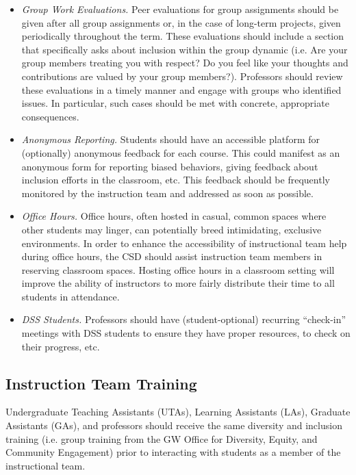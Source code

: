 \documentclass{article}
\begin{document}
\begin{itemize}
\item
\emph{Group Work Evaluations.} Peer evaluations for group assignments should be given after all group assignments 
or, in the case of long-term projects, given periodically throughout the term. These evaluations should include a 
section that specifically asks about inclusion within the group dynamic (i.e. Are your group members treating 
you with respect? Do you feel like your thoughts and contributions are valued by your group members?). Professors 
should review these evaluations in a timely manner and engage with groups who identified issues. 
In particular, such cases should be met with concrete, appropriate consequences.

\item
\emph{Anonymous Reporting.} 
Students should have an accessible platform for (optionally) anonymous feedback for each course. 
This could manifest as an anonymous form for reporting biased behaviors, giving feedback about inclusion efforts 
in the classroom, etc. This feedback should be frequently monitored by the instruction team and addressed as soon 
as possible. 

\item 
\emph{Office Hours.} 
Office hours, often hosted in casual, common spaces where other students may linger, 
can potentially breed intimidating, exclusive environments. In order to enhance the accessibility of 
instructional team help during office hours, the CSD should assist instruction team members in reserving 
classroom spaces. Hosting office hours in a classroom setting will improve the ability of instructors to more 
fairly distribute their time to all students in attendance. 

\item
\emph{DSS Students.} 
Professors should have (student-optional) recurring “check-in” meetings with DSS students to 
ensure they have proper resources, to check on their progress, etc.
\end{itemize}

\subsection{Instruction Team Training} 
Undergraduate Teaching Assistants (UTAs), Learning Assistants (LAs), Graduate Assistants (GAs), and 
professors should receive the same diversity and inclusion training (i.e. group training from the GW Office 
for Diversity, Equity, and Community Engagement) prior to interacting with students as a member of the 
instructional team. 
\end{document}
